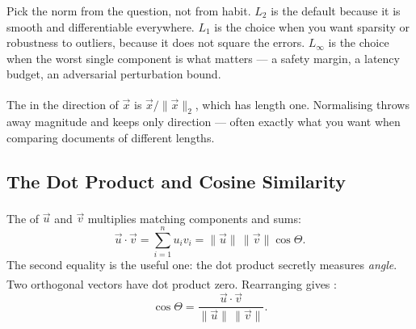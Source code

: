 \begin{engineernote}
Pick the norm from the question, not from habit. $L_2$ is the default because
it is smooth and differentiable everywhere. $L_1$ is the choice when you want
sparsity or robustness to outliers, because it does not square the errors.
$L_\infty$ is the choice when the worst single component is what matters ---
a safety margin, a latency budget, an adversarial perturbation bound.
\end{engineernote}

The  in the direction of $\vec{x}$ is
$\vec{x}/\lVert\vec{x}\rVert_2$, which has length
one\textsuperscript{\cite[][p.~262]{cherneyLinearAlgebra2013}}. Normalising
throws away magnitude and keeps only direction --- often exactly what you want
when comparing documents of different lengths.

\subsection{The Dot Product and Cosine Similarity}

The  of $\vec{u}$ and $\vec{v}$ multiplies matching
components and sums\textsuperscript{\cite[][p.~89]{cherneyLinearAlgebra2013}}:
\begin{equation}
  \vec{u}\cdot\vec{v} = \sum_{i=1}^{n} u_i v_i
  = \lVert\vec{u}\rVert\,\lVert\vec{v}\rVert\cos\Theta .
  \label{eq:math-dot}
\end{equation}
The second equality is the useful one: the dot product secretly measures
\emph{angle}. Two orthogonal vectors have dot product
zero\textsuperscript{\cite[][p.~30]{fischerMaschinellesLernenFuer2024}}.
Rearranging gives :
\begin{equation}
  \cos\Theta = \frac{\vec{u}\cdot\vec{v}}
                    {\lVert\vec{u}\rVert\,\lVert\vec{v}\rVert} .
  \label{eq:math-cosine}
\end{equation}

